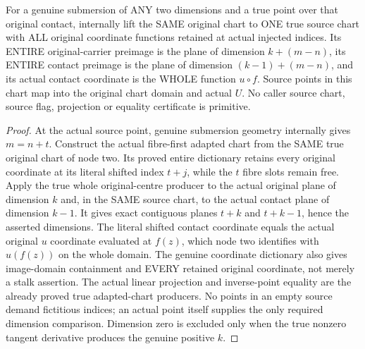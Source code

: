 \begin{theorem}
\label{hir:submersion-contact-coordinates-internal-source-flag}
\leanok
For a genuine submersion of ANY two dimensions and a true point over that
original contact, internally lift the SAME original chart to ONE true source
chart with ALL original coordinate functions retained at actual injected
indices. Its ENTIRE original-carrier preimage is the plane of dimension
$k+(m-n)$, its ENTIRE contact preimage is the plane of dimension
$(k-1)+(m-n)$, and its actual contact coordinate is the WHOLE function
$u\circ f$. Source points in this chart map into the original chart domain
and actual $U$. No caller source chart, source flag, projection or equality
certificate is primitive.
\end{theorem}
\begin{proof}
At the actual source point, genuine submersion geometry internally gives
$m=n+t$. Construct the actual fibre-first adapted chart from the SAME true
original chart of node two. Its proved entire dictionary retains every
original coordinate at its literal shifted index $t+j$, while the $t$ fibre
slots remain free. Apply the true whole original-centre producer to the
actual original plane of dimension $k$ and, in the SAME source chart, to the
actual contact plane of dimension $k-1$. It gives exact contiguous planes
$t+k$ and $t+k-1$, hence the asserted dimensions. The literal shifted contact
coordinate equals the actual original $u$ coordinate evaluated at $f(z)$,
which node two identifies with $u(f(z))$ on the whole domain. The genuine
coordinate dictionary also gives image-domain containment and EVERY
retained original coordinate, not merely a stalk assertion. The actual
linear projection and inverse-point equality are the already proved true
adapted-chart producers. No points in an empty source demand fictitious
indices; an actual point itself supplies the only required dimension
comparison. Dimension zero is excluded only when the true nonzero tangent
derivative produces the genuine positive $k$.
\end{proof}

